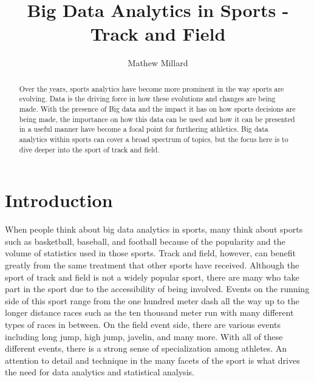 \documentclass[sigconf]{acmart}
\begin{document}
\title{Big Data Analytics in Sports - Track and Field}


\author{Mathew Millard}

\renewcommand{\shortauthors}{M. Millard}

\begin{abstract}
Over the years, sports analytics have become more prominent in the way sports are evolving. Data is the driving force in how these evolutions and changes are being made. With the presence of Big data and the impact it has on how sports decisions are being made, the importance on how this data can be used and how it can be presented in a useful manner have become a focal point for furthering athletics. Big data analytics within sports can cover a broad spectrum of topics, but the focus here is to dive deeper into the sport of track and field.
\end{abstract}



\maketitle

\section{Introduction}
When people think about big data analytics in sports, many think about sports such as basketball, baseball, and football because of the popularity and the volume of statistics used in those sports. Track and field, however, can benefit greatly from the same treatment that other sports have received. Although the sport of track and field is not a widely popular sport, there are many who take part in the sport due to the accessibility of being involved. Events on the running side of this sport range from the one hundred meter dash all the way up to the longer distance races such as the ten thousand meter run with many different types of races in between. On the field event side, there are various events including long jump, high jump, javelin, and many more. With all of these different events, there is a strong sense of specialization among athletes. An attention to detail and technique in the many facets of the sport is what drives the need for data analytics and statistical analysis.
\end{document}
